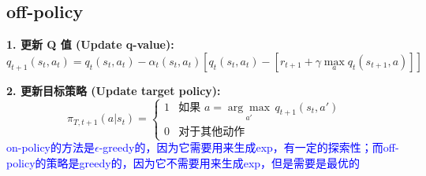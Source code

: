 \documentclass{article}
\begin{document}
\subsection*{off-policy}
\textbf{1. 更新 Q 值 (Update q-value):}
\[
q_{t+1}(s_t, a_t) = q_t(s_t, a_t) - \alpha_t(s_t, a_t) \left[ q_t(s_t, a_t) - [r_{t+1} + \gamma \max_{a} q_t(s_{t+1}, a)] \right]
\]

\textbf{2. 更新目标策略 (Update target policy):}
\[
\pi_{T, t+1}(a|s_t) =
\begin{cases}
    1 & \text{如果 } a = \underset{a'}{\arg\max} \, q_{t+1}(s_t, a') \\
    0 & \text{对于其他动作}
\end{cases}
\]
\textcolor{blue}{\kaishu*on-policy的方法是$\epsilon$-greedy的，因为它需要用来生成exp，有一定的探索性；而off-policy的策略是greedy的，因为它不需要用来生成exp，但是需要是最优的}
\end{document}
